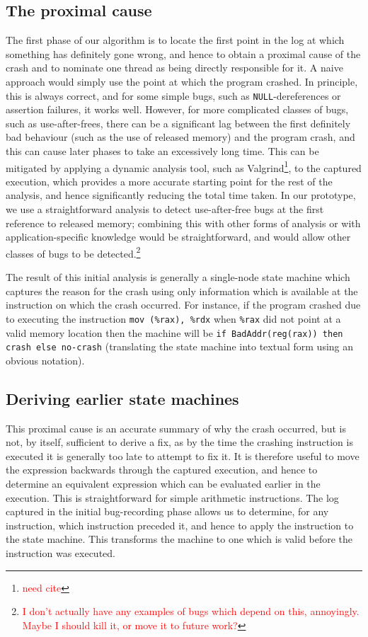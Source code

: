 \documentclass[10pt,twocolumn,preprint,natbib,authoryear]{sigplanconf}
\newcommand{\editorial}[1]{\textcolor{red}{\footnote{\textcolor{red}{#1}}}}
\newcommand{\needCite}{\editorial{need cite}}
\begin{document}
\subsection{The proximal cause}
The first phase of our algorithm is to locate the first point in the
log at which something has definitely gone wrong, and hence to obtain
a proximal cause of the crash and to nominate one thread as being
directly responsible for it.  A naive approach would simply use the
point at which the program crashed.  In principle, this is always
correct, and for some simple bugs, such as \verb|NULL|-dereferences or
assertion failures, it works well.  However, for more complicated
classes of bugs, such as use-after-frees, there can be a significant
lag between the first definitely bad behaviour (such as the use of
released memory) and the program crash, and this can cause later
phases to take an excessively long time.  This can be mitigated by
applying a dynamic analysis tool, such as Valgrind\needCite{}, to the
captured execution, which provides a more accurate starting point for
the rest of the analysis, and hence significantly reducing the total
time taken.  In our prototype, we use a straightforward analysis to
detect use-after-free bugs at the first reference to released memory;
combining this with other forms of analysis or with
application-specific knowledge would be straightforward, and would
allow other classes of bugs to be detected.\editorial{I don't actually
  have any examples of bugs which depend on this, annoyingly.  Maybe I
  should kill it, or move it to future work?}

The result of this initial analysis is generally a single-node state
machine which captures the reason for the crash using only information
which is available at the instruction on which the crash occurred.
For instance, if the program crashed due to executing the instruction
\verb|mov (%rax), %rdx| when \verb|%rax| did not point at a valid
memory location then the machine will be
\verb|if BadAddr(reg(rax)) then crash else no-crash| (translating the
state machine into textual form using an obvious notation).

\subsection{Deriving earlier state machines}
This proximal cause is an accurate summary of why the crash occurred,
but is not, by itself, sufficient to derive a fix, as by the time the
crashing instruction is executed it is generally too late to attempt
to fix it.  It is therefore useful to move the expression backwards
through the captured execution, and hence to determine an equivalent
expression which can be evaluated earlier in the execution.  This is
straightforward for simple arithmetic instructions.  The log captured
in the initial bug-recording phase allows us to determine, for any
instruction, which instruction preceded it, and hence to apply the
instruction to the state machine.  This transforms the machine to one
which is valid before the instruction was executed.
\end{document}
